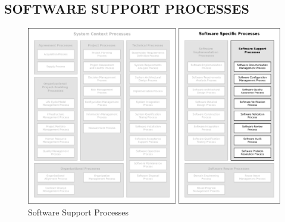 	\newpage 
	\subsection{SOFTWARE SUPPORT PROCESSES\label{subsec:software_support_processes}}

		\begin{figure}[h]
			\centering
			\includegraphics[width=15cm,keepaspectratio]{figures/life-cycle-process-groups-software-support-processes.pdf}
			\caption{Software Support Processes}
			\label{fig:software_support_processes}
		\end{figure}

